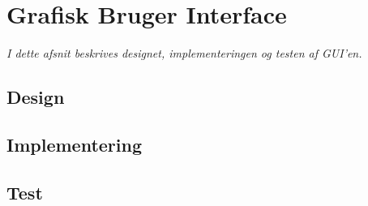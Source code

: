 \section{Grafisk Bruger Interface}
\textit{I dette afsnit beskrives designet, implementeringen og testen af GUI'en.}

\subsection{Design}
\subsection{Implementering}
\subsection{Test}